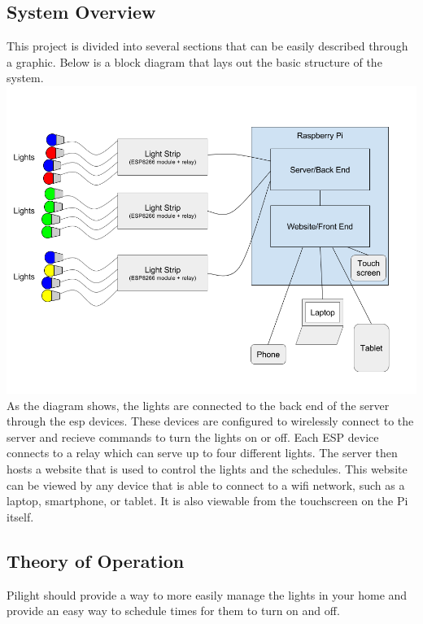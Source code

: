 \subsection{System Overview}
This project is divided into several sections that can be easily described through a graphic. Below is a block diagram that lays out the basic structure of the system.\\
\includegraphics[width=1.0\textwidth]{block-diagram.png}\\
As the diagram shows, the lights are connected to the back end of the server through the esp devices. These devices are configured to wirelessly connect to the server and recieve commands to turn the lights on or off. Each ESP device connects to a relay which can serve up to four different lights. The server then hosts a website that is used to control the lights and the schedules. This website can be viewed by any device that is able to connect to a wifi network, such as a laptop, smartphone, or tablet. It is also viewable from the touchscreen on the Pi itself.
\subsection{Theory of Operation}
Pilight should provide a way to more easily manage the lights in your home and provide an easy way to schedule times for them to turn on and off. 